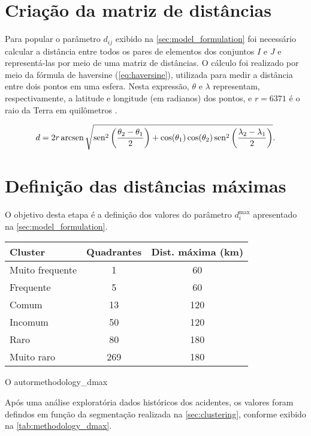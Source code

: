 \section{Criação da matriz de distâncias}

Para popular o parâmetro $d_{ij}$ exibido na \autoref{sec:model_formulation} foi necessário calcular a distância entre todos os pares de elementos dos conjuntos $I$ e $J$ e representá-las por meio de uma matriz de distâncias. O cálculo foi realizado por meio da fórmula de haversine (\autoref{eq:haversine}), utilizada para medir a distância entre dois pontos em uma esfera. Nesta expressão, $\theta$ e $\lambda$ representam, respectivamente, a latitude e longitude (em radianos) dos pontos, e $r = 6371$ é o raio da Terra em quilômetros \cite{Mahmoud2016}.

\begin{equation} \label{eq:haversine}
d = 2r \operatorname{arcsen} \sqrt{\operatorname{sen}^2 \left( \dfrac{\theta_2 - \theta_1}{2} \right) + \cos(\theta_1) \cos(\theta_2) \operatorname{sen}^2 \left( \dfrac{\lambda_2 - \lambda_1}{2}\right)} \text{.}
\end{equation} 

\section{Definição das distâncias máximas}

O objetivo desta etapa é a definição dos valores do parâmetro $d_i^\text{max}$ apresentado na \autoref{sec:model_formulation}.

{\begin{tabular}{l|c|c}\hline
    Cluster & Quadrantes & Dist. máxima (km) \\ \hline\hline
    Muito frequente & 1 & 60\\
    Frequente & 5 & 60\\
    Comum & 13 & 120\\
    Incomum & 50 & 120\\
    Raro & 80 & 180\\
    Muito raro & 269 & 180\\
    \hline
\end{tabular}}
{O autor}{methodology_dmax}{}{}

Após uma análise exploratória dados históricos dos acidentes, os valores foram defindos em função da segmentação realizada na \autoref{sec:clustering}, conforme exibido na \autoref{tab:methodology_dmax}.

